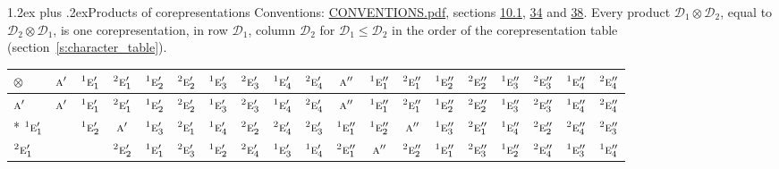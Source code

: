 \documentclass[10pt,a4paper]{article}
\makeatletter
\renewcommand\section{\@startsection{section}{1}{\z@}{-3ex plus -1ex minus -.2ex}%
  {1.2ex plus .2ex}{\normalfont\large\sffamily\bfseries\color{parttitle}}}
\numberwithin{equation}{section}
\newcommand{\irr}[1]{\text{\normalfont\scshape #1}}
\newcommand{\conjpair}[1]{{}^{#1}}
\newcommand{\irrprod}{\otimes}
\makeatother
\begin{document}
\section{Products of corepresentations}\label{s:fusion}
Conventions: \href{../../CONVENTIONS.pdf}{CONVENTIONS.pdf}, sections \href{../../../rotation/CONVENTIONS.pdf\#conv.10.1}{10.1}, \href{../../CONVENTIONS.pdf\#conv.34}{34} and \href{../../CONVENTIONS.pdf\#conv.38}{38}.
\leavevmode\label{n:matrix.corep.factors}Every product $\mathcal{D}_1\irrprod\mathcal{D}_2$, equal to $\mathcal{D}_2\irrprod\mathcal{D}_1$, is one corepresentation, in row $\mathcal{D}_1$, column $\mathcal{D}_2$ for $\mathcal{D}_1 \le \mathcal{D}_2$ in the order of the corepresentation table (section~\ref{s:character_table}).
{\small\setlength{\tabcolsep}{3pt}\begin{longtable}{@{}lcccccccccccccccccc@{}}\toprule
$\irrprod$ & $\irr{a}'$ & $\conjpair{1}\irr{e}_{1}'$ & $\conjpair{2}\irr{e}_{1}'$ & $\conjpair{1}\irr{e}_{2}'$ & $\conjpair{2}\irr{e}_{2}'$ & $\conjpair{1}\irr{e}_{3}'$ & $\conjpair{2}\irr{e}_{3}'$ & $\conjpair{1}\irr{e}_{4}'$ & $\conjpair{2}\irr{e}_{4}'$ & $\irr{a}''$ & $\conjpair{1}\irr{e}_{1}''$ & $\conjpair{2}\irr{e}_{1}''$ & $\conjpair{1}\irr{e}_{2}''$ & $\conjpair{2}\irr{e}_{2}''$ & $\conjpair{1}\irr{e}_{3}''$ & $\conjpair{2}\irr{e}_{3}''$ & $\conjpair{1}\irr{e}_{4}''$ & $\conjpair{2}\irr{e}_{4}''$\\\midrule\endhead
\bottomrule\endfoot\endlastfoot
$\irr{a}'$ & $\irr{a}'$ & $\conjpair{1}\irr{e}_{1}'$ & $\conjpair{2}\irr{e}_{1}'$ & $\conjpair{1}\irr{e}_{2}'$ & $\conjpair{2}\irr{e}_{2}'$ & $\conjpair{1}\irr{e}_{3}'$ & $\conjpair{2}\irr{e}_{3}'$ & $\conjpair{1}\irr{e}_{4}'$ & $\conjpair{2}\irr{e}_{4}'$ & $\irr{a}''$ & $\conjpair{1}\irr{e}_{1}''$ & $\conjpair{2}\irr{e}_{1}''$ & $\conjpair{1}\irr{e}_{2}''$ & $\conjpair{2}\irr{e}_{2}''$ & $\conjpair{1}\irr{e}_{3}''$ & $\conjpair{2}\irr{e}_{3}''$ & $\conjpair{1}\irr{e}_{4}''$ & $\conjpair{2}\irr{e}_{4}''$\\*
$\conjpair{1}\irr{e}_{1}'$ &  & $\conjpair{1}\irr{e}_{2}'$ & $\irr{a}'$ & $\conjpair{1}\irr{e}_{3}'$ & $\conjpair{2}\irr{e}_{1}'$ & $\conjpair{1}\irr{e}_{4}'$ & $\conjpair{2}\irr{e}_{2}'$ & $\conjpair{2}\irr{e}_{4}'$ & $\conjpair{2}\irr{e}_{3}'$ & $\conjpair{1}\irr{e}_{1}''$ & $\conjpair{1}\irr{e}_{2}''$ & $\irr{a}''$ & $\conjpair{1}\irr{e}_{3}''$ & $\conjpair{2}\irr{e}_{1}''$ & $\conjpair{1}\irr{e}_{4}''$ & $\conjpair{2}\irr{e}_{2}''$ & $\conjpair{2}\irr{e}_{4}''$ & $\conjpair{2}\irr{e}_{3}''$\\
$\conjpair{2}\irr{e}_{1}'$ &  &  & $\conjpair{2}\irr{e}_{2}'$ & $\conjpair{1}\irr{e}_{1}'$ & $\conjpair{2}\irr{e}_{3}'$ & $\conjpair{1}\irr{e}_{2}'$ & $\conjpair{2}\irr{e}_{4}'$ & $\conjpair{1}\irr{e}_{3}'$ & $\conjpair{1}\irr{e}_{4}'$ & $\conjpair{2}\irr{e}_{1}''$ & $\irr{a}''$ & $\conjpair{2}\irr{e}_{2}''$ & $\conjpair{1}\irr{e}_{1}''$ & $\conjpair{2}\irr{e}_{3}''$ & $\conjpair{1}\irr{e}_{2}''$ & $\conjpair{2}\irr{e}_{4}''$ & $\conjpair{1}\irr{e}_{3}''$ & $\conjpair{1}\irr{e}_{4}''$\\

\end{longtable}}
\end{document}
